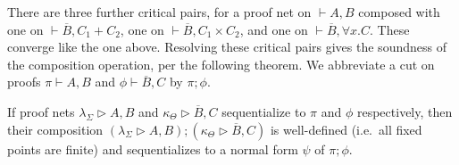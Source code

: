 \documentclass[UKenglish]{lipics-v2019}
\newcommand\+{+}
\renewcommand\*{\times}
\newcommand\dual[1]{\overline{#1}}
\newcommand\seq[2]{{\vdash}#1,#2}
\newcommand\prf[3]{#1\vdash\!#2,#3}
\newcommand\net[3]{#1\triangleright #2,#3}
\newcommand\comp{\mathbin;}
\begin{document}
\noindent
There are three further critical pairs, for a proof net on $\seq AB$ composed with one on $\seq {\dual B}{C_1{\+}C_2}$, one on $\seq {\dual B}{C_1{\*}C_2}$, and one on $\seq {\dual B}{\forall x.C}$. These converge like the one above.
%
Resolving these critical pairs gives the soundness of the composition operation, per the following theorem. We abbreviate a cut on proofs $\prf\pi AB$ and $\prf\phi{\dual B}C$ by $\pi\comp\phi$.

\begin{theorem}
\label{thm:composition}
If proof nets $\net{\lambda_\Sigma}AB$ and $\net{\kappa_\Theta}{\dual B}C$ sequentialize to $\pi$ and $\phi$ respectively, then their composition $(\net{\lambda_\Sigma}AB)\comp(\net{\kappa_\Theta}{\dual B}C)$ is well-defined (i.e.\ all fixed points are finite) and sequentializes to a normal form $\psi$ of $\pi\comp\phi$.
\end{theorem}

\newcommand\yA{2.7}
\newcommand\yB{1.65}
\newcommand\yC{1.05}
\end{document}
